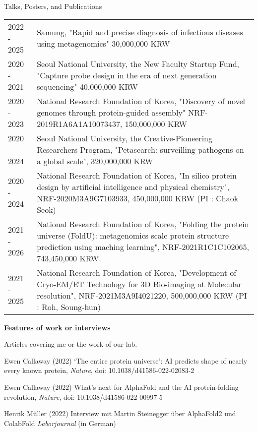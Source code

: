 \documentclass{resume} %
\begin{document}
\begin{rSection}{Talks, Posters, and Publications}
\begin{tabular}{p{3.6cm}p{13.0cm}}
2022 - 2025 & Samung, "Rapid and precise diagnosis of infectious diseases using metagenomics"  30,000,000 KRW
\\[1.mm]  
2020 - 2021 & Seoul National University, the New Faculty Startup Fund, "Capture probe design in the era of next generation sequencing"  40,000,000 KRW
\\[1.mm] 
2020 - 2023 & National Research Foundation of Korea, "Discovery of novel genomes through protein-guided assembly" NRF-2019R1A6A1A10073437, 150,000,000 KRW  
\\[1.mm] 
2020 - 2024 & Seoul National University, the Creative-Pioneering Researchers Program, "Petasearch: surveilling pathogens on a global scale",  320,000,000 KRW
\\[1.mm] 
2020 - 2024 & National Research Foundation of Korea, "In silico protein design by artificial intelligence and physical chemistry", NRF-2020M3A9G7103933, 450,000,000 KRW (PI : Chaok Seok)
\\[1.mm] 
2021 - 2026 & National Research Foundation of Korea, "Folding the protein universe (FoldU): metagenomics scale protein structure prediction using maching learning", NRF-2021R1C1C102065, 743,450,000 KRW.
\\[1.mm] 
2021 - 2025 & National Research Foundation of Korea, "Development of Cryo-EM/ET Technology for 3D Bio-imaging at Molecular resolution", NRF-2021M3A9I4021220, 500,000,000  KRW (PI : Roh, Soung-hun) 
\\[1.mm] 

\end{tabular}
\vspace{1mm}
\newpage

{\bf Features of work or interviews }\vspace{1mm}

Articles covering me or the work of our lab. 
\begin{thebibliography}{10}
\vspace{-13mm}

Ewen Callaway (2022)
‘The entire protein universe’: AI predicts shape of nearly every known protein, {\em Nature}, doi: 10.1038/d41586-022-02083-2

Ewen Callaway (2022)
What's next for AlphaFold and the AI protein-folding revolution, {\em Nature}, doi: 10.1038/d41586-022-00997-5

Henrik Müller (2022)
Interview mit Martin Steinegger über AlphaFold2 und ColabFold {\em Laborjournal} (in German)


\end{thebibliography}
\end{rSection}
\end{document}
